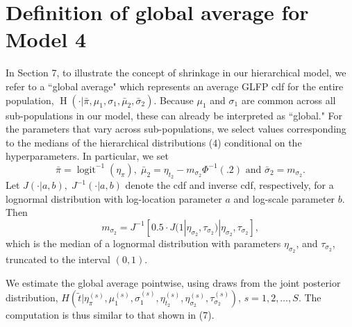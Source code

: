 \documentclass[12pt]{article}
\newcommand{\op}{\operatorname}
\begin{document}
{\section{Definition of global average for Model 4}
\label{global-avg}
In Section 7, to illustrate the concept of shrinkage in our hierarchical model, we refer to a ``global average" which represents an average GLFP cdf for the entire population, $\op{H}\left(\cdot|\bar{\pi},\mu_1,\sigma_1,\bar{\mu}_2,\bar{\sigma}_2\right)$. Because $\mu_1$ and $\sigma_1$ are common across all sub-populations in our model, these can already be interpreted as ``global." For the parameters that vary across sub-populations, we select values corresponding to the medians of the hierarchical distributions (4) conditional on the hyperparameters. In particular, we set
$$\bar{\pi}=\op{logit}^{-1}(\eta_{\pi}),\;\bar{\mu}_2=\eta_{t_2} - m_{\sigma_2}\Phi^{-1}(.2) \mbox{ and } \bar{\sigma}_2= m_{\sigma_2}.$$
Let $J(\cdot|a,b),\;J^{-1}(\cdot|a,b)$ denote the cdf and inverse cdf, respectively, for a lognormal distribution with log-location parameter $a$ and log-scale parameter $b$. Then
$$m_{\sigma_2}=J^{-1}[0.5 \cdot J(1|\eta_{\sigma_2},\tau_{\sigma_2})|\eta_{\sigma_2}, \tau_{\sigma_2}],$$
which is the median of a lognormal distribution with parameters $\eta_{\sigma_2}$, and $\tau_{\sigma_2}$, truncated to the interval $(0, 1)$.

We estimate the global average pointwise, using draws from the joint posterior distribution, $H\left(\tilde{t}|\eta_\pi^{(s)}, \mu_1^{(s)}, \sigma_1^{(s)}, \eta_{t_2}^{(s)},\eta_{\sigma_2}^{(s)},\tau_{\sigma_2}^{(s)}\right)$, $s=1,2,\ldots,S$. The computation is thus similar to that shown in (7).
}



\end{document}
